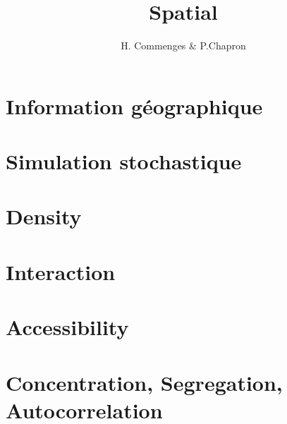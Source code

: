 \documentclass{beamer}
\author{H. Commenges & P.Chapron}
\title{Spatial}
\date{}
\begin{document}
\section{Information géographique}

  
  
  
  
\section{Simulation stochastique}

  
  
\section{Density}

 

\section{Interaction}

  

\section{Accessibility}

 

\section{Concentration, Segregation, Autocorrelation}
  

\end{document}
